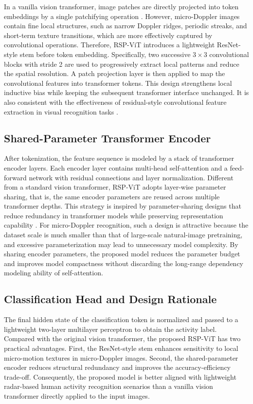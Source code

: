 \documentclass{svproc}
\begin{document}
In a vanilla vision transformer, image patches are directly projected into token embeddings by a single patchifying operation \cite{Dosovitskiy2021ViT}. However, micro-Doppler images contain fine local structures, such as narrow Doppler ridges, periodic streaks, and short-term texture transitions, which are more effectively captured by convolutional operations. Therefore, RSP-ViT introduces a lightweight ResNet-style stem before token embedding. Specifically, two successive $3 \times 3$ convolutional blocks with stride 2 are used to progressively extract local patterns and reduce the spatial resolution. A patch projection layer is then applied to map the convolutional features into transformer tokens. This design strengthens local inductive bias while keeping the subsequent transformer interface unchanged. It is also consistent with the effectiveness of residual-style convolutional feature extraction in visual recognition tasks \cite{He2016ResNet}.

\subsection{Shared-Parameter Transformer Encoder}

After tokenization, the feature sequence is modeled by a stack of transformer encoder layers. Each encoder layer contains multi-head self-attention and a feed-forward network with residual connections and layer normalization. Different from a standard vision transformer, RSP-ViT adopts layer-wise parameter sharing, that is, the same encoder parameters are reused across multiple transformer depths. This strategy is inspired by parameter-sharing designs that reduce redundancy in transformer models while preserving representation capability \cite{Lan2020ALBERT}. For micro-Doppler recognition, such a design is attractive because the dataset scale is much smaller than that of large-scale natural-image pretraining, and excessive parameterization may lead to unnecessary model complexity. By sharing encoder parameters, the proposed model reduces the parameter budget and improves model compactness without discarding the long-range dependency modeling ability of self-attention.

\subsection{Classification Head and Design Rationale}

The final hidden state of the classification token is normalized and passed to a lightweight two-layer multilayer perceptron to obtain the activity label. Compared with the original vision transformer, the proposed RSP-ViT has two practical advantages. First, the ResNet-style stem enhances sensitivity to local micro-motion textures in micro-Doppler images. Second, the shared-parameter encoder reduces structural redundancy and improves the accuracy-efficiency trade-off. Consequently, the proposed model is better aligned with lightweight radar-based human activity recognition scenarios than a vanilla vision transformer directly applied to the input images.
\end{document}
